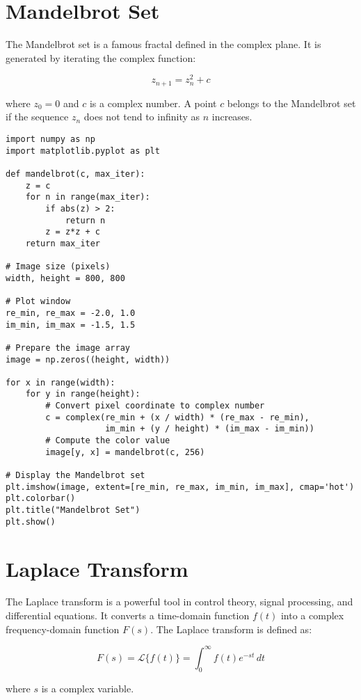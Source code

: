 \documentclass{article}
\begin{document}
\section{Mandelbrot Set}
The Mandelbrot set is a famous fractal defined in the complex plane. It is generated by iterating the complex function:

\[
z_{n+1} = z_n^2 + c
\]

where \( z_0 = 0 \) and \( c \) is a complex number. A point \( c \) belongs to the Mandelbrot set if the sequence \( z_n \) does not tend to infinity as \( n \) increases.

\begin{lstlisting}[caption={mandelbrot_set.py -- Generating the Mandelbrot Set}, label=code:mandelbrot_set]
import numpy as np
import matplotlib.pyplot as plt

def mandelbrot(c, max_iter):
    z = c
    for n in range(max_iter):
        if abs(z) > 2:
            return n
        z = z*z + c
    return max_iter

# Image size (pixels)
width, height = 800, 800

# Plot window
re_min, re_max = -2.0, 1.0
im_min, im_max = -1.5, 1.5

# Prepare the image array
image = np.zeros((height, width))

for x in range(width):
    for y in range(height):
        # Convert pixel coordinate to complex number
        c = complex(re_min + (x / width) * (re_max - re_min),
                    im_min + (y / height) * (im_max - im_min))
        # Compute the color value
        image[y, x] = mandelbrot(c, 256)

# Display the Mandelbrot set
plt.imshow(image, extent=[re_min, re_max, im_min, im_max], cmap='hot')
plt.colorbar()
plt.title("Mandelbrot Set")
plt.show()
\end{lstlisting}

\section{Laplace Transform}
The Laplace transform is a powerful tool in control theory, signal processing, and differential equations. It converts a time-domain function \( f(t) \) into a complex frequency-domain function \( F(s) \). The Laplace transform is defined as:

\[
F(s) = \mathcal{L}\{f(t)\} = \int_0^{\infty} f(t) e^{-st} \, dt
\]

where \( s \) is a complex variable.
\end{document}

